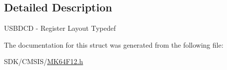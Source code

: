 \subsection{Detailed Description}
U\+S\+B\+D\+CD -\/ Register Layout Typedef 

The documentation for this struct was generated from the following file\+:\begin{DoxyCompactItemize}
\item 
S\+D\+K/\+C\+M\+S\+I\+S/\mbox{\hyperlink{_m_k64_f12_8h}{M\+K64\+F12.\+h}}\end{DoxyCompactItemize}
